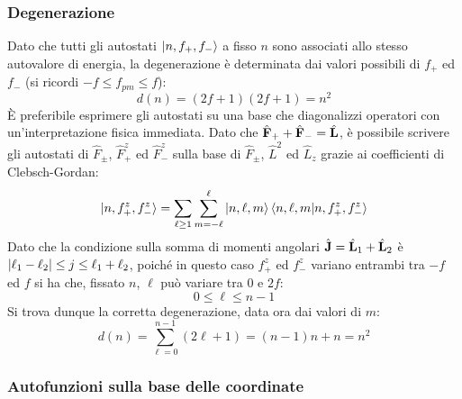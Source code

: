 \subsubsection{Degenerazione}

Dato che tutti gli autostati $ \ket{n,f_+,f_-} $ a fisso $ n $ sono associati allo stesso autovalore di energia, la degenerazione è determinata dai valori possibili di $ f_+ $ ed $ f_- $ (si ricordi $ -f \le f_{pm} \le f $):
\begin{equation}
	d(n) = (2f + 1) (2f + 1) = n^2
	\label{eq:3.63}
\end{equation}
È preferibile esprimere gli autostati su una base che diagonalizzi operatori con un'interpretazione fisica immediata. Dato che $ \hat{\mathbf{F}}_+ + \hat{\mathbf{F}}_- = \hat{\mathbf{L}} $, è possibile scrivere gli autostati di $ \hat{F}_{\pm} $, $ \hat{F}_+^z $ ed $ \hat{F}_-^z $ sulla base di $ \hat{F}_{\pm} $, $ \hat{L}^2 $ ed $ \hat{L}_z $ grazie ai coefficienti di Clebsch-Gordan:
\begin{equation}
	\ket{n,f_+^z,f_-^z} = \sum_{\ell \ge 1} \sum_{m = -\ell}^{\ell} \ket{n,\ell,m} \braket{n,\ell,m | n,f_+^z,f_-^z}
	\label{eq:3.64}
\end{equation}
Dato che la condizione sulla somma di momenti angolari $ \hat{\mathbf{J}} = \hat{\mathbf{L}}_1 + \hat{\mathbf{L}}_2 $ è $ \left\lvert\ell_1 - \ell_2\right\rvert \le j \le \ell_1 + \ell_2 $, poiché in questo caso $ f_+^z $ ed $ f_-^z $ variano entrambi tra $ -f $ ed $ f $ si ha che, fissato $ n $, $ \ell $ può variare tra $ 0 $ e $ 2f $:
\begin{equation}
	0 \le \ell \le n - 1
	\label{eq:3.65}
\end{equation}
Si trova dunque la corretta degenerazione, data ora dai valori di $ m $:
\begin{equation*}
	d(n) = \sum_{\ell = 0}^{n - 1} (2\ell + 1) = (n - 1) n + n = n^2
\end{equation*}

\subsubsection{Autofunzioni sulla base delle coordinate}

